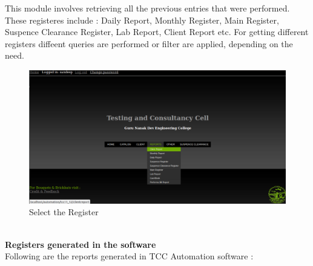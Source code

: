 This module involves retrieving all the previous entries that were performed. These registeres include : Daily Report, Monthly Register, Main Register, Suspence Clearance Register, Lab Report, Client Report etc. For getting different registers diffeent queries are performed or filter are applied, depending on the need.\\
\begin{figure}[h]
\centering \includegraphics[scale=1.0]{registers.png}
\caption{Select the Register}
\end{figure}\\
{\bf Registers generated in the software}\\
Following are the reports generated in TCC Automation software :
